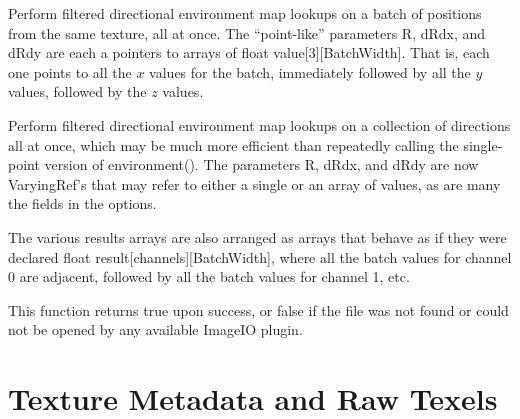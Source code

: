 
Perform filtered directional environment map lookups on a batch of positions
from the same texture, all at once. The ``point-like'' parameters {\cf R},
{\cf dRdx}, and {\cf dRdy} are each a pointers to arrays of
{\cf float value[3][BatchWidth]}. That is, each one points to all the $x$ values
for the batch, immediately followed by all the $y$ values, followed by the
$z$ values.

Perform filtered directional environment map lookups on a collection of
directions all at once, which may be much more efficient than repeatedly
calling the single-point version of {\cf environment()}.  The parameters
{\cf R}, {\cf dRdx}, and {\cf dRdy} are now {\cf VaryingRef}'s that may
refer to either a single or an array of values, as are many the fields in
the {\cf options}.

The various results arrays are also arranged as arrays that behave as if
they were declared {\cf  float result[channels][BatchWidth]}, where all the
batch values for channel 0 are adjacent, followed by all the batch values
for channel 1, etc.

This function returns {\cf true} upon success, or {\cf false} if the
file was not found or could not be opened by any available ImageIO
plugin.
\apiend


\section{Texture Metadata and Raw Texels}
\label{sec:texturesys:api:gettextureinfo}
\label{sec:texturesys:api:getimagespec}


